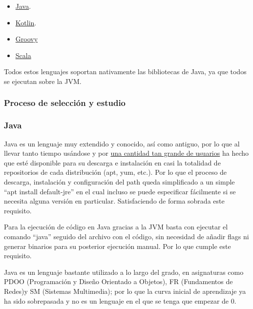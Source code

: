 \begin{itemize}
    \item \href{https://www.java.com/es/}{Java}.
    \item \href{https://kotlinlang.org/}{Kotlin}.
    \item \href{https://groovy-lang.org/}{Groovy}
    \item \href{https://www.scala-lang.org/}{Scala}
\end{itemize}

Todos estos lenguajes soportan nativamente las bibliotecas de Java, ya que todos
se ejecutan sobre la JVM.

\subsubsection{Proceso de selección y estudio}

\subsubsection{Java}

\begin{todolist}
    \item[\xcmark] Java es un lenguaje muy extendido y conocido, así como
    antiguo, por lo que al llevar tanto tiempo usándose y por
    \href{https://www.stackscale.com/es/blog/lenguajes-programacion-mas-populares/}{una
    cantidad tan grande de usuarios} ha hecho que esté disponible para su
    descarga e instalación en casi la totalidad de repositorios de cada
    distribución (apt, yum, etc.). Por lo que el proceso de descarga, instalación
    y configuración del path queda simplificado a un simple ``apt install
    default-jre'' en el cual incluso se puede especificar fácilmente si se
    necesita alguna versión en particular. Satisfaciendo de forma sobrada este
    requisito.
    \item[\xcmark] Para la ejecución de código en Java gracias a la JVM basta
    con ejecutar el comando ``java'' seguido del archivo con el código, sin
    necesidad de añadir flags ni generar binarios para su posterior ejecución
    manual. Por lo que cumple este requisito.
    \item[\xcmark] Java es un lenguaje bastante utilizado a lo largo del grado,
    en asignaturas como PDOO (Programación y Diseño Orientado a Objetos), FR
    (Fundamentos de Redes)y SM (Sistemas Multimedia); por lo que la curva
    inicial de aprendizaje ya ha sido sobrepasada y no es un lenguaje en el que
    se tenga que empezar de 0.
\end{todolist}

